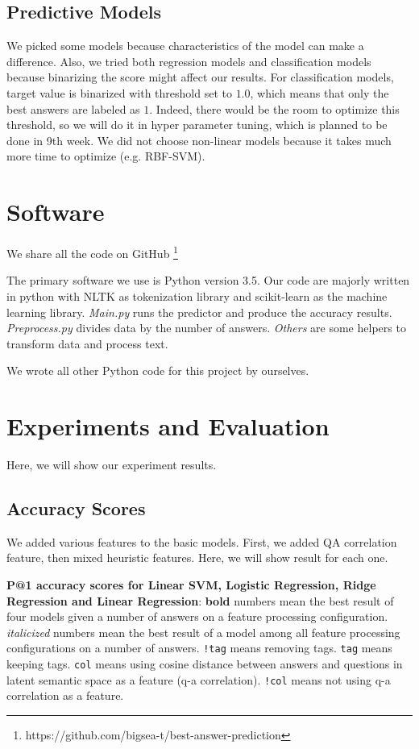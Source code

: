 \documentclass[11pt]{article}
\begin{document}
\subsection{Predictive Models}
We picked some models because characteristics of the model can make a difference. Also, we tried both regression models and classification models because binarizing the score might affect our results. For classification models, target value is binarized with threshold set to $1.0$, which means that only the best answers are labeled as $1$. Indeed, there would be the room to optimize this threshold, so we will do it in hyper parameter tuning, which is planned to be done in 9th week.  We did not choose non-linear models because it takes much more time to optimize (e.g. RBF-SVM).

\section{Software}

We share all the code on GitHub \footnote{{\small https://github.com/bigsea-t/best-answer-prediction}}

The primary software we use is Python version 3.5. Our code are majorly written in python with NLTK  as tokenization library and scikit-learn as the machine learning library. \textit{Main.py} runs the predictor and produce the accuracy results. \textit{Preprocess.py} divides data by the number of answers. \textit{Others} are some helpers to transform data and process text.

We wrote all other Python code for this project by ourselves.
\section{Experiments and Evaluation}
Here, we will show our experiment results. 

\subsection{Accuracy Scores}
We added various features to the basic models. First, we added QA correlation feature, then mixed heuristic features. Here, we will show result for each one.

\begin{table}[t]
\centering

\caption{\textbf{P@1 accuracy scores for Linear SVM, Logistic Regression, Ridge Regression and Linear Regression}: \textbf{bold} numbers mean the best result of four models given a  number of answers on a feature processing configuration.  \textit{italicized} numbers mean the best result of a model among all feature processing configurations on a number of answers. \texttt{!tag} means removing tags. \texttt{tag} means keeping tags. \texttt{col} means using cosine distance between answers and questions in latent semantic space as a feature (q-a correlation). \texttt{!col} means not using q-a correlation as a feature.}
\label{tab_accuracy}
\end{table}
\end{document}
